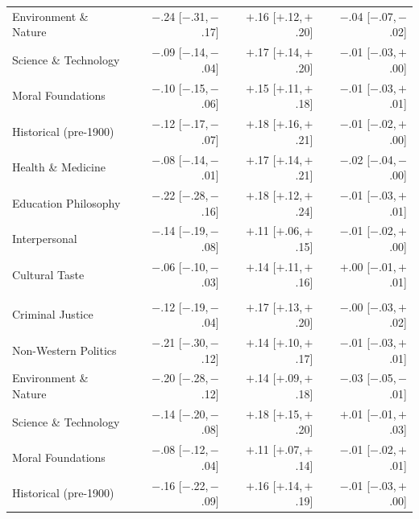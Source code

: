 \begin{table}[h]
\begin{tabular}{l r r r}
Environment \& Nature & $-$.24 \scriptsize{[$-$.31,\,$-$.17]} & $+$.16 \scriptsize{[$+$.12,\,$+$.20]} & $-$.04 \scriptsize{[$-$.07,\,$-$.02]} \\
Science \& Technology & $-$.09 \scriptsize{[$-$.14,\,$-$.04]} & $+$.17 \scriptsize{[$+$.14,\,$+$.20]} & $-$.01 \scriptsize{[$-$.03,\,$+$.00]} \\
Moral Foundations & $-$.10 \scriptsize{[$-$.15,\,$-$.06]} & $+$.15 \scriptsize{[$+$.11,\,$+$.18]} & $-$.01 \scriptsize{[$-$.03,\,$+$.01]} \\
Historical (pre-1900) & $-$.12 \scriptsize{[$-$.17,\,$-$.07]} & $+$.18 \scriptsize{[$+$.16,\,$+$.21]} & $-$.01 \scriptsize{[$-$.02,\,$+$.00]} \\
Health \& Medicine & $-$.08 \scriptsize{[$-$.14,\,$-$.01]} & $+$.17 \scriptsize{[$+$.14,\,$+$.21]} & $-$.02 \scriptsize{[$-$.04,\,$-$.00]} \\
Education Philosophy & $-$.22 \scriptsize{[$-$.28,\,$-$.16]} & $+$.18 \scriptsize{[$+$.12,\,$+$.24]} & $-$.01 \scriptsize{[$-$.03,\,$+$.01]} \\
Interpersonal & $-$.14 \scriptsize{[$-$.19,\,$-$.08]} & $+$.11 \scriptsize{[$+$.06,\,$+$.15]} & $-$.01 \scriptsize{[$-$.02,\,$+$.00]} \\
Cultural Taste & $-$.06 \scriptsize{[$-$.10,\,$-$.03]} & $+$.14 \scriptsize{[$+$.11,\,$+$.16]} & $+$.00 \scriptsize{[$-$.01,\,$+$.01]} \\
\addlinespace
\multicolumn{4}{l}{\textit{Applied finance}} \\
Criminal Justice & $-$.12 \scriptsize{[$-$.19,\,$-$.04]} & $+$.17 \scriptsize{[$+$.13,\,$+$.20]} & $-$.00 \scriptsize{[$-$.03,\,$+$.02]} \\
Non-Western Politics & $-$.21 \scriptsize{[$-$.30,\,$-$.12]} & $+$.14 \scriptsize{[$+$.10,\,$+$.17]} & $-$.01 \scriptsize{[$-$.03,\,$+$.01]} \\
Environment \& Nature & $-$.20 \scriptsize{[$-$.28,\,$-$.12]} & $+$.14 \scriptsize{[$+$.09,\,$+$.18]} & $-$.03 \scriptsize{[$-$.05,\,$-$.01]} \\
Science \& Technology & $-$.14 \scriptsize{[$-$.20,\,$-$.08]} & $+$.18 \scriptsize{[$+$.15,\,$+$.20]} & $+$.01 \scriptsize{[$-$.01,\,$+$.03]} \\
Moral Foundations & $-$.08 \scriptsize{[$-$.12,\,$-$.04]} & $+$.11 \scriptsize{[$+$.07,\,$+$.14]} & $-$.01 \scriptsize{[$-$.02,\,$+$.01]} \\
Historical (pre-1900) & $-$.16 \scriptsize{[$-$.22,\,$-$.09]} & $+$.16 \scriptsize{[$+$.14,\,$+$.19]} & $-$.01 \scriptsize{[$-$.03,\,$+$.00]} \\

\end{tabular}
\end{table}
